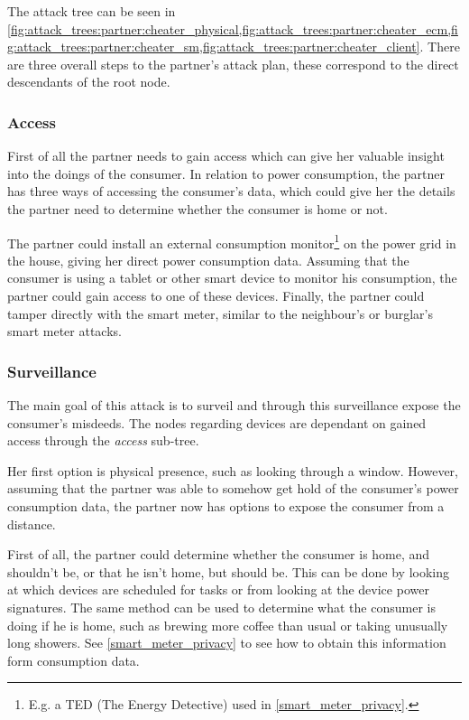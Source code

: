 The attack tree can be seen in \cref{fig:attack_trees:partner:cheater_physical,fig:attack_trees:partner:cheater_ecm,fig:attack_trees:partner:cheater_sm,fig:attack_trees:partner:cheater_client}.
There are three overall steps to the partner's attack plan, these correspond to the direct descendants of the root node.

\subsubsection{Access}
First of all the partner needs to gain access which can give her valuable insight into the doings of the consumer.
In relation to power consumption, the partner has three ways of accessing the consumer's data, which could give her the details the partner need to determine whether the consumer is home or not.

The partner could install an external consumption monitor\footnote{E.g. a TED (The Energy Detective) used in \cref {smart_meter_privacy}.} on the power grid in the house, giving her direct power consumption data.
Assuming that the consumer is using a tablet or other smart device to monitor his consumption, the partner could gain access to one of these devices.
Finally, the partner could tamper directly with the smart meter, similar to the neighbour's or burglar's smart meter attacks.

\subsubsection{Surveillance}
The main goal of this attack is to surveil and through this surveillance expose the consumer's misdeeds.
The nodes regarding devices are dependant on gained access through the \textit{access} sub-tree.

Her first option is physical presence, such as looking through a window.
However, assuming that the partner was able to somehow get hold of the consumer's power consumption data, the partner now has options to expose the consumer from a distance.

First of all, the partner could determine whether the consumer is home, and shouldn't be, or that he isn't home, but should be.
This can be done by looking at which devices are scheduled for tasks or from looking at the device power signatures.
The same method can be used to determine what the consumer is doing if he is home, such as brewing more coffee than usual or taking unusually long showers.
See \cref{smart_meter_privacy} to see how to obtain this information form consumption data.

